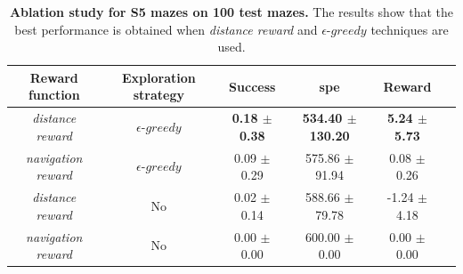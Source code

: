 \begin{table}
    \centering
    \begin{tabular}{c c c c c c}
        \toprule
        Reward function            & Exploration strategy     & Success                  & \acrshort{spe}               & Reward                   \\
        \midrule
        \textit{distance reward}   & $\epsilon\text{-}greedy$ & \textbf{0.18 $\pm$ 0.38} & \textbf{534.40 $\pm$ 130.20} & \textbf{5.24 $\pm$ 5.73} \\
        \textit{navigation reward} & $\epsilon\text{-}greedy$ & 0.09 $\pm$ 0.29          & 575.86 $\pm$ 91.94           & 0.08 $\pm$ 0.26          \\
        \textit{distance reward}   & No                       & 0.02 $\pm$ 0.14          & 588.66 $\pm$ 79.78           & -1.24 $\pm$ 4.18         \\
        \textit{navigation reward} & No                       & 0.00 $\pm$ 0.00          & 600.00 $\pm$ 0.00            & 0.00 $\pm$ 0.00          \\
        \bottomrule
    \end{tabular}
    \caption{\textbf{Ablation study for S5 mazes on 100 test mazes.} The results show that the best performance is obtained when \textit{distance reward} and $\epsilon\text{-}greedy$ techniques are used.}
    \label{tab:ablation-study}
\end{table}

